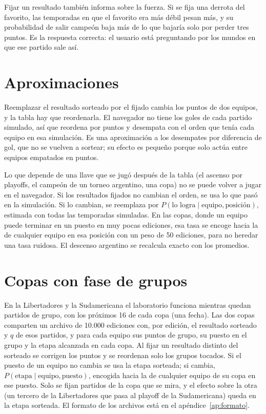Fijar un resultado también informa sobre la fuerza. Si se fija una derrota del favorito, las temporadas en que el favorito era más débil pesan más, y su probabilidad de salir campeón baja más de lo que bajaría solo por perder tres puntos. Es la respuesta correcta: el usuario está preguntando por los mundos en que ese partido sale así.

\section{Aproximaciones}

Reemplazar el resultado sorteado por el fijado cambia los puntos de dos equipos, y la tabla hay que reordenarla. El navegador no tiene los goles de cada partido simulado, así que reordena por puntos y desempata con el orden que tenía cada equipo en esa simulación. Es una aproximación a los desempates por diferencia de gol, que no se vuelven a sortear; su efecto es pequeño porque solo actúa entre equipos empatados en puntos.

Lo que depende de una llave que se jugó después de la tabla (el ascenso por playoffs, el campeón de un torneo argentino, una copa) no se puede volver a jugar en el navegador. Si los resultados fijados no cambian el orden, se usa lo que pasó en la simulación. Si lo cambian, se reemplaza por $P(\text{lo logra}\mid\text{equipo},\text{posición})$, estimada con todas las temporadas simuladas. En las copas, donde un equipo puede terminar en un puesto en muy pocas ediciones, esa tasa se encoge hacia la de cualquier equipo en esa posición con un peso de 50 ediciones, para no heredar una tasa ruidosa. El descenso argentino se recalcula exacto con los promedios.

\section{Copas con fase de grupos}

En la Libertadores y la Sudamericana el laboratorio funciona mientras quedan partidos de grupo, con los próximos 16 de cada copa (una fecha). Las dos copas comparten un archivo de 10.000 ediciones con, por edición, el resultado sorteado y $q$ de esos partidos, y para cada equipo sus puntos de grupo, su puesto en el grupo y la etapa alcanzada en cada copa. Al fijar un resultado distinto del sorteado se corrigen los puntos y se reordenan solo los grupos tocados. Si el puesto de un equipo no cambia se usa la etapa sorteada; si cambia, $P(\text{etapa}\mid\text{equipo},\text{puesto})$, encogida hacia la de cualquier equipo de su copa en ese puesto. Solo se fijan partidos de la copa que se mira, y el efecto sobre la otra (un tercero de la Libertadores que pasa al playoff de la Sudamericana) queda en la etapa sorteada. El formato de los archivos está en el apéndice~\ref{ap:formato}.
